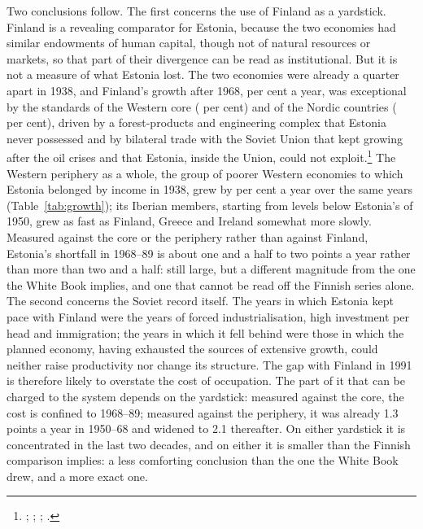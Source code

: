 Two conclusions follow. The first concerns the use of Finland as a yardstick. Finland is a revealing comparator for Estonia, because the two economies had similar endowments of human capital, though not of natural resources or markets, so that part of their divergence can be read as institutional. But it is not a measure of what Estonia lost. The two economies were already a quarter apart in 1938, and Finland's growth after 1968,  per cent a year, was exceptional by the standards of the Western core ( per cent) and of the Nordic countries ( per cent), driven by a forest-products and engineering complex that Estonia never possessed and by bilateral trade with the Soviet Union that kept growing after the oil crises and that Estonia, inside the Union, could not exploit.\footnote{\autocite[150--1]{kaukiainen2006}; \autocite[168]{hannikainen2006}; \autocite[154]{norkus_restorations}; \autocite[206]{dellenbrant1992}.} The Western periphery as a whole, the group of poorer Western economies to which Estonia belonged by income in 1938, grew by  per cent a year over the same years (Table~\ref{tab:growth}); its Iberian members, starting from levels below Estonia's of 1950, grew as fast as Finland, Greece and Ireland somewhat more slowly. Measured against the core or the periphery rather than against Finland, Estonia's shortfall in 1968--89 is about one and a half to two points a year rather than more than two and a half: still large, but a different magnitude from the one the White Book implies, and one that cannot be read off the Finnish series alone. The second concerns the Soviet record itself. The years in which Estonia kept pace with Finland were the years of forced industrialisation, high investment per head and immigration; the years in which it fell behind were those in which the planned economy, having exhausted the sources of extensive growth, could neither raise productivity nor change its structure. The gap with Finland in 1991 is therefore likely to overstate the cost of occupation. The part of it that can be charged to the system depends on the yardstick: measured against the core, the cost is confined to 1968--89; measured against the periphery, it was already 1.3 points a year in 1950--68 and widened to 2.1 thereafter. On either yardstick it is concentrated in the last two decades, and on either it is smaller than the Finnish comparison implies: a less comforting conclusion than the one the White Book drew, and a more exact one.

